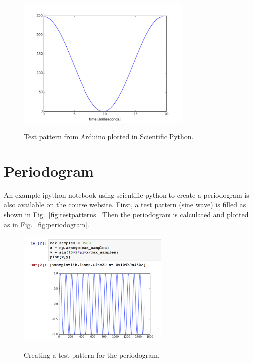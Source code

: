 \documentclass[12pt]{article}
\begin{document}
\begin{figure}[htbp]
\begin{center}
{\includegraphics[width=0.75\textwidth]{figs/waveform.png}}
\end{center}
\caption{\label{fig:wave} Test pattern from Arduino plotted in Scientific Python.}
\end{figure}


\section{Periodogram}

An example ipython notebook using scientific python to create a periodogram is also available on the course website.  First, a test pattern (sine wave) is filled as shown in Fig.~\ref{fig:testpatterns}.  Then the periodogram is calculated and plotted as in Fig.~\ref{fig:periodogram}.

\begin{figure}[htbp]
\begin{center}
{\includegraphics[width=0.65\textwidth]{figs/testpattern.png}}
\end{center}
\caption{\label{fig:testpattern} Creating a test pattern for the periodogram.}
\end{figure}
\end{document}
